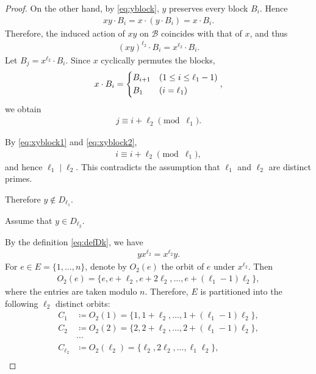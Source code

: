 \documentclass[12pt,reqno]{amsart}
\newcommand{\mcB}{\mathcal{B}}
\newcommand{\HL}{\vspace{2mm}}							%
\newcommand{\ceq}{\coloneqq} 							%
\theoremstyle{mythmstyle}
\theoremstyle{mydefstyle}
\numberwithin{equation}{section}
\begin{document}
\begin{proof}
On the other hand, by \eqref{eq:yblock}, $y$ preserves every block $B_i$.
Hence
\begin{align}
xy\cdot B_i = x\cdot(y\cdot B_i) = x\cdot B_i.
\end{align}
Therefore, the induced action of $xy$ on $\mcB$ coincides with that of $x$, and thus
\begin{align}
(xy)^{\ell_2}\cdot B_i = x^{\ell_2}\cdot B_i.
\end{align}
Let $B_{j} = x^{\ell_{2}}\cdot B_{i}$. Since $x$ cyclically permutes the blocks,
\begin{align}
x \cdot B_{i} =
\begin{dcases}
B_{i+1} & (1 \le i \le \ell_{1}-1) \\
B_{1} & (i = \ell_{1})
\end{dcases},
\end{align}
we obtain
\begin{align}
\label{eq:xyblock2}
j \equiv i + \ell_{2} \pmod{\ell_{1}}.
\end{align}

By \eqref{eq:xyblock1} and \eqref{eq:xyblock2},
\begin{align}
i \equiv i + \ell_{2} \pmod{\ell_{1}},
\end{align}
and hence $\ell_1\mid\ell_2$.
This contradicts the assumption that $\ell_1$ and $\ell_2$ are distinct primes.

Therefore $y \notin D_{\ell_{1}}$.
\HL

\item[(ii)] Assume that $y \in D_{\ell_{2}}$.

By the definition \eqref{eq:defDk}, we have
\begin{align}
\label{eq:ycomm2}
yx^{\ell_{2}} = x^{\ell_{2}}y.
\end{align}
For $e \in E = \{ 1, \ldots, n \}$, denote by $O_{2}(e)$ the orbit of $e$ under $x^{\ell_{2}}$.
Then
\begin{align}
O_{2}(e) = \{ e, e+\ell_{2}, e+2\ell_{2}, \ldots, e+(\ell_{1}-1)\ell_{2} \},
\end{align}
where the entries are taken modulo $n$. Therefore, $E$ is partitioned into the following
$\ell_2$ distinct orbits:
\begin{align}
C_{1} &\ceq O_{2}(1) = \{ 1, 1+\ell_{2}, \ldots, 1 + (\ell_{1}-1)\ell_{2} \}, \\
C_{2} &\ceq O_{2}(2) = \{ 2, 2+\ell_{2}, \ldots, 2 + (\ell_{1}-1)\ell_{2} \}, \\
&\cdots \\
C_{\ell_{2}} &\ceq O_{2}(\ell_{2}) = \{ \ell_{2}, 2\ell_{2}, \ldots, \ell_{1}\ell_{2} \}, \\
\end{align}


\end{proof}
\end{document}
